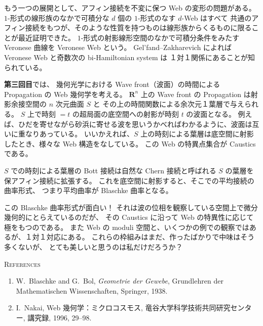 \documentclass[uplatex,dvipdfmx]{jlreq}
\begin{document}
もう一つの展開として、アフィン接続を不変に保つ Web の変形の問題がある。
$1$-形式の線形族のなかで可積分な $d$ 個の $1$-形式のなす $d$-Web はすべて
共通のアフィン接続をもつが、そのような性質を持つものは線形族からくるものに限ることが最近証明できた。
$1$-形式の射影線形空間のなかで可積分条件をみたす Veronese 曲線を Veronese Web という。
Gel'fand--Zakharevich によれば Veronese Web と奇数次の bi-Hamiltonian system は
１対１関係にあることが知られている。

\bigskip

\noindent\textbf{第三回目}では、
幾何光学における Wave front（波面）の時間による Propagation の Web 幾何学を考える。
$\mathbf{R}^n$ 上の Wave front の Propagation は射影余接空間の $n$ 次元曲面 $S$ と
その上の時間関数による余次元１葉層で与えられる。
$S$ 上で時刻 $= t$ の超局面の底空間への射影が時刻 $t$ の波面となる。
例えば、ひだを寄せながら砂浜に寄せる波を思いうかべればわかるように、波面は互いに重なりあっている。
いいかえれば、$S$ 上の時刻による葉層は底空間に射影したとき、様々な Web 構造をなしている。
この Web の特異点集合が Caustics である。

$S$ での時刻による葉層の Bott 接続は自然な Chern 接続と呼ばれる $S$ の葉層を保アフィン接続に拡張する。
これを底空間に射影すると、そこでの平均接続の曲率形式、
つまり平均曲率が Blaschke 曲率となる。

この Blaschke 曲率形式が面白い！
それは波の位相を観察している空間上で微分幾何的にとらえているのだが、
その Caustics に沿って Web の特異性に応じて極をもつのである。
また Web の moduli 空間と、いくつかの例での観察ではあるが、１対１対応にある。
これらの枠組みはまだ、作ったばかりで中味はそう多くないが、
とても美しいと思うのは私だけだろうか？

\bigskip

\begin{center}
  \textsc{References}
\end{center}

\begin{enumerate}
  \item W.~Blaschke and G.~Bol,
        \textit{Geometrie der Gewebe},
        Grundlehren der Mathematischen Wissenschaften,
        Springer, 1938.
  \item I.~Nakai,
        Web 幾何学：ミクロコスモス,
        竜谷大学科学技術共同研究センター, 講究録, 1996, 29--98.
\end{enumerate}
\end{document}
